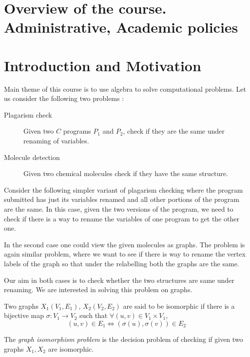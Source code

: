 
\section{Overview of the course. Administrative, Academic policies}
\newpage

\section{Introduction and Motivation}
Main theme of this course is to use algebra to solve computational problems.
Let us consider the following two problems :
\begin{description}
	\item [Plagarism check]
	Given two $C$ programs $P_1$ and $P_2$, check if they are the same
	under renaming of variables.
	\item [Molecule detection]
	Given two chemical molecules check if they have the same structure.
\end{description}

Consider the following simpler variant of plagarism checking where the program
submitted has just its variables renamed and all other portions of the program
are the same. In this case, given the two versions of the program, we need to
check if there is a way to rename the variables of one program to get the
other one. 

In the second case one could view the given molecules as graphs. The problem
is again similar problem, where we want to see if there is way to rename the
vertex labels of the graph so that under the relabelling both the graphs are
the same.

Our aim in both cases is to check whether the two structures are same under
renaming. We are interested in solving this problem on graphs.

\begin{definition}
	Two graphs $X_1(V_1,E_1)$, $X_2(V_2,E_2)$ are said to be isomorphic if
	there is a bijective map $\sigma:V_1 \to V_2$ such that $\forall
	(u,v) \in V_1 \times V_1$, \[(u,v) \in E_1 \iff (\sigma(u), \sigma(v))
	\in E_2 \]
\end{definition}
\begin{problem}
	The \emph{graph isomorphism problem} is the decision problem of
	checking if given two graphs $X_1, X_2$ are isomorphic.
\end{problem}

